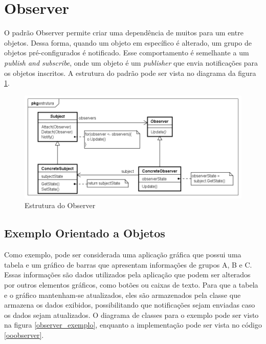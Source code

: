 \section{Observer}

O padrão Observer permite criar uma dependência de muitos 
para um entre objetos. Dessa forma, quando um 
objeto em específico é alterado, um grupo de objetos 
pré-configurados é notificado. Esse comportamento é 
semelhante a um \textit{publish and subscribe}, onde 
um objeto é um \textit{publisher} que envia notificações 
para os objetos inscritos. A estrutura do padrão pode ser 
vista no diagrama da figura \ref{observer_struct}.

\begin{figure}[htb]
	\caption{\label{observer_struct}Estrutura do Observer}
	\begin{center}
	    \includegraphics[scale=0.5]{5_padroes-contexto-funcional/5.3_comportamentais/5.3.07_observer/observer_estrutura.png}
	\end{center}
\end{figure}

\subsection*{Exemplo Orientado a Objetos}

Como exemplo, pode ser considerada uma aplicação 
gráfica que possui uma tabela e um gráfico de 
barras que apresentam informações de grupos 
A, B e C. Essas informações são dados utilizados 
pela aplicação que podem ser alterados por outros 
elementos gráficos, como botões ou caixas de texto. 
Para que a tabela e o gráfico mantenham-se atualizados, 
eles são armazenados pela classe que armazena 
os dados exibidos, possibilitando que 
notificações sejam enviadas 
caso os dados sejam atualizados. O diagrama 
de classes para o exemplo pode ser visto na figura 
\ref{observer_exemplo}, enquanto a implementação 
pode ser vista no código \ref{ooobserver}.


